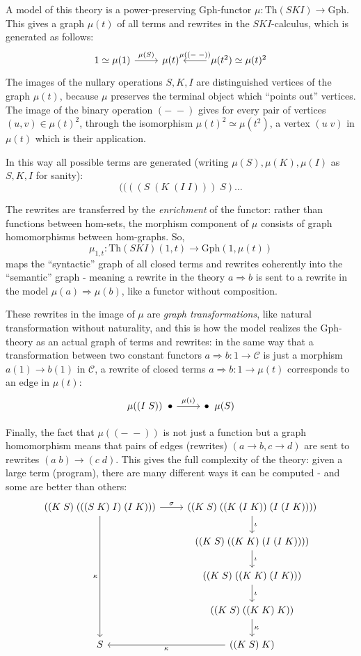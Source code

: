 \documentclass[a4paper,UKenglish]{article}
\theoremstyle{definition}
\newcommand{\Th}{\mathrm{Th}}
\newcommand{\Gph}{\mathrm{Gph}}
\newcommand{\C}{\mathscr{C}}
\begin{document}
A model of this theory is a power-preserving $\Gph$-functor $\mu: \Th(SKI) \to \Gph$. This gives a graph $\mu(t)$ of all terms and rewrites in the $SKI$-calculus, which is generated as follows:
\[\begin{tikzcd}
1 \simeq \mu(1) \arrow[r,"\mu(S)"] & \mu(t) & \mu(t^2) \arrow[l,swap,"\mu(\left(-\;-\right))"] \simeq \mu(t)^2
\end{tikzcd}\]
The images of the nullary operations $S,K,I$ are distinguished vertices of the graph $\mu(t)$, because $\mu$ preserves the terminal object which ``points out'' vertices. The image of the binary operation $(-\; -)$ gives for every pair of vertices $(u,v) \in \mu(t)^2$, through the isomorphism $\mu(t)^2 \simeq \mu(t^2)$, a vertex $(u\; v)$ in $\mu(t)$ which is their application.

In this way all possible terms are generated (writing $\mu(S),\mu(K),\mu(I)$ as $S,K,I$ for sanity): $$((((S\; (K\; (I\; I)))\; S) \dots$$

The rewrites are transferred by the \textit{enrichment} of the functor: rather than functions between hom-sets, the morphism component of $\mu$ consists of graph homomorphisms between hom-graphs. So, $$\mu_{1,t}: \Th(SKI)(1,t)\to \Gph(1,\mu(t))$$ maps the ``syntactic'' graph of all closed terms and rewrites coherently into the ``semantic'' graph - meaning a rewrite in the theory $a\Rightarrow b$ is sent to a rewrite in the model $\mu(a) \Rightarrow \mu(b)$, like a functor without composition.

These rewrites in the image of $\mu$ are \textit{graph transformations}, like natural transformation without naturality, and this is how the model realizes the $\Gph$-theory as an actual graph of terms and rewrites: in the same way that a transformation between two constant functors $a\Rightarrow b: 1\to \C$ is just a morphism $a(1)\to b(1)$ in $\C$, a rewrite of closed terms $a\Rightarrow b: 1\to \mu(t)$ corresponds to an edge in $\mu(t)$:
\[\begin{tikzcd}
	\mu((I\; S)) \;\; \bullet \arrow[r,"\mu(\iota)"] & \bullet \;\; \mu(S)
\end{tikzcd}\]

Finally, the fact that $\mu((-\;-))$ is not just a function but a graph homomorphism means that pairs of edges (rewrites) $(a\to b, c\to d)$ are sent to rewrites $(a\; b) \to (c\; d)$. This gives the full complexity of the theory: given a large term (program), there are many different ways it can be computed - and some are better than others:
\[\begin{tikzcd}
	((K\; S)\; (((S\; K)\; I)\; (I\; K))) \arrow[r,"\sigma"] \arrow[dddd,swap,"\kappa"] & ((K\; S)\; ((K\;(I\; K))\; (I\; (I\; K)))) \arrow[d,"\iota"]\\
	& ((K\; S)\; ((K\; K)\; (I\; (I\; K)))) \arrow[d,"\iota"]\\
	& ((K\; S)\; ((K\; K)\; (I\; K))) \arrow[d,"\iota"]\\
	& ((K\; S)\; ((K\; K)\; K)) \arrow[d,"\kappa"]\\
	S & ((K\; S)\; K)\arrow[l,"\kappa"]\\
\end{tikzcd}\]\\
\end{document}
